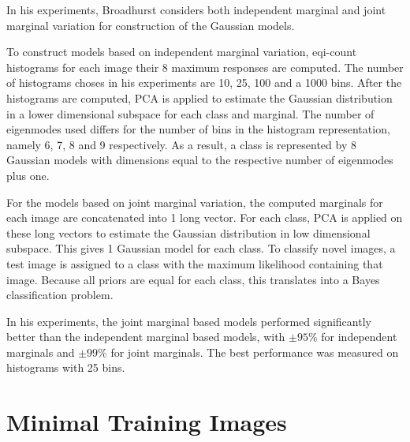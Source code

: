 
In his experiments, Broadhurst considers both independent marginal and joint marginal variation for construction of the Gaussian models. 

To construct models based on independent marginal variation, eqi-count histograms for each image their 8 maximum responses are computed. The number of histograms choses in his experiments are 10, 25, 100 and a 1000 bins. After the histograms are computed, PCA is applied to estimate the Gaussian distribution in a lower dimensional subspace for each class and marginal. The number of eigenmodes used differs for the number of bins in the histogram representation, namely 6, 7, 8 and 9 respectively. As a result, a class is represented by 8 Gaussian models with dimensions equal to the respective number of eigenmodes plus one. 

For the models based on joint marginal variation, the computed marginals for each image are concatenated into 1 long vector. For each class, PCA is applied on these long vectors to estimate the Gaussian distribution in low dimensional subspace. This gives 1 Gaussian model for each class. To classify novel images, a test image is assigned to a class with the maximum likelihood containing that image. Because all priors are equal for each class, this translates into a Bayes classification problem.

In his experiments, the joint marginal based models performed significantly better than the independent marginal based models, with $\pm 95\%$ for independent marginals and $\pm 99\%$ for joint marginals. The best performance was measured on histograms with 25 bins. 

\section{Minimal Training Images}\label{sec:Minimal}

